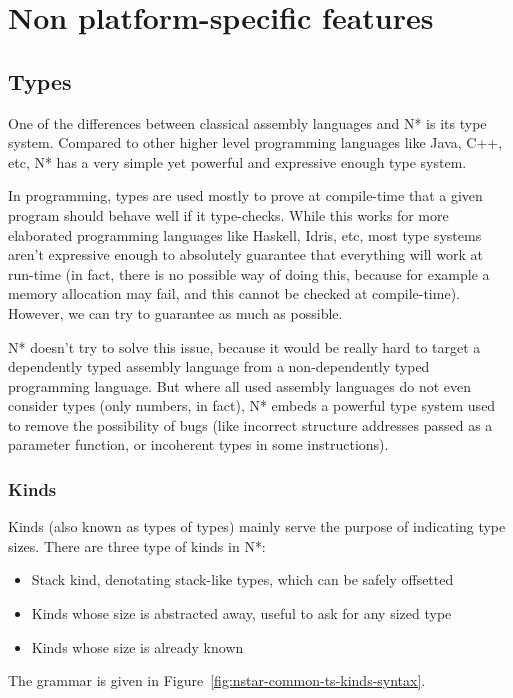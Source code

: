 \chapter{Non platform-specific features}\label{chap:nstar-common}

\section{Types}\label{sec:nstar-common-ts}

One of the differences between classical assembly languages and N* is its type system.
Compared to other higher level programming languages like Java, C++, etc, N* has a very simple yet powerful and expressive enough type system.

In programming, types are used mostly to prove at compile-time that a given program should behave well if it type-checks. While this works for more elaborated programming languages like Haskell, Idris, etc, most type systems aren't expressive enough to absolutely guarantee that everything will work at run-time (in fact, there is no possible way of doing this, because for example a memory allocation may fail, and this cannot be checked at compile-time). However, we can try to guarantee as much as possible.

N* doesn't try to solve this issue, because it would be really hard to target a dependently typed assembly language from a non-dependently typed programming language. But where all used assembly languages do not even consider types (only numbers, in fact), N* embeds a powerful type system used to remove the possibility of bugs (like incorrect structure addresses passed as a parameter function, or incoherent types in some instructions).

\subsection{Kinds}\label{subsec:nstar-common-ts-kinds}

Kinds (also known as types of types) mainly serve the purpose of indicating type sizes.
There are three type of kinds in N*:
\begin{itemize}
  \item Stack kind, denotating stack-like types, which can be safely offsetted
  \item Kinds whose size is abstracted away, useful to ask for any sized type
  \item Kinds whose size is already known
\end{itemize}
The grammar is given in Figure~\ref{fig:nstar-common-ts-kinds-syntax}.

